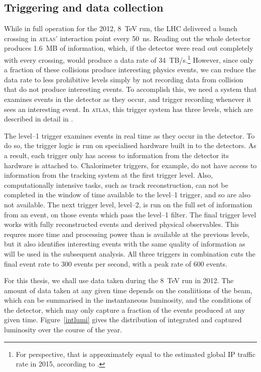 \subsection{Triggering and data collection}
While in full operation for the 2012, 8~TeV run, the LHC delivered a bunch crossing in \textsc{atlas}' interaction point every 50~ns. Reading out the whole detector produces 1.6~MB of information, which, if the detector were read out completely with every crossing, would produce a data rate of 34~TB/s.\footnote{For perspective, that is approximately equal to the estimated global IP traffic rate in 2015, according to \cite{wolframip}.} However, since only a fraction of these collisions produce interesting physics events, we can reduce the data rate to less prohibitive levels simply by not recording data from collision that do not produce interesting events. To accomplish this, we need a system that examines events in the detector as they occur, and trigger recording whenever it sees an interesting event. In \textsc{atlas}, this trigger system has three levels, which are described in detail in \cite{detectorpaper}. 

The level--1 trigger examines events in real time as they occur in the detector. To do so, the trigger logic is run on specialised hardware built in to the detectors. As a result, each trigger only has access to information from the detector its hardware is attached to. Chalorimeter triggers, for example, do not have access to information from the tracking system at the first trigger level. Also, computationally intensive tasks, such as track reconstruction, can not be completed in the window of time available to the level--1 trigger, and so are also not available. The next trigger level, level--2, is run on the full set of information from an event, on those events which pass the level--1 filter. The final trigger level works with fully reconstructed events and derived physical observables. This requres more time and processing power than is available at the previous levels, but it also identifies interesting events with the same quality of information as will be used in the subsequent analysis. All three triggers in combination cuts the final event rate to 300 events per second, with a peak rate of 600 events.

For this thesis, we shall use data taken during the 8~TeV run in 2012. The amount of data taken at any given time depends on the condiitions of the beam, which can be summarised in the instantaneous luminosity, and the conditions of the detector, which may only capture a fraction of the events produced at any given time. Figure~\ref{intlumi} gives the distribution of integrated and captured luminosity over the course of the year.

